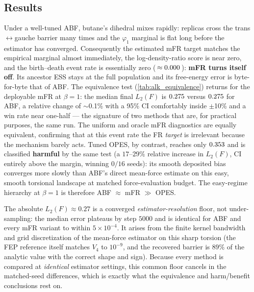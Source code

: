 \subsection{Results}

Under a well-tuned ABF, butane's dihedral mixes rapidly: replicas cross the
trans$\leftrightarrow$gauche barrier many times and the $\varphi_1$ marginal is flat
long before the estimator has converged. Consequently the estimated mFR target
matches the empirical marginal almost immediately, the log-density-ratio score is
near zero, and the birth--death event rate is essentially zero
(\,$\approx0.000$\,): \textbf{mFR turns itself off}. Its ancestor ESS
stays at the full population and its free-energy error is byte-for-byte that of ABF.
The equivalence test (\cref{tab:alk_equivalence}) returns
\textbf{\AlkButaneVerdict} for the deployable mFR at $\beta=1$: the median final
$L_2(F)$ is $\AlkButaneFrL2$ versus $\AlkButaneAbfL2$ for ABF, a relative change of
$\sim$0.1\% with a 95\% CI comfortably inside $\pm$10\% and a win rate near
one-half --- the signature of two methods that are, for practical purposes, the same
run. The uniform and oracle mFR diagnostics are equally equivalent, confirming that
at this event rate the FR \emph{target} is irrelevant because the mechanism barely
acts. Tuned OPES, by contrast, reaches only $\AlkButaneOpesL2$ and is classified
\textbf{harmful} by the same test (a $17$--$29\%$ relative increase in $L_2(F)$,
CI entirely above the margin, winning $0/16$ seeds): its smooth deposited bias
converges more slowly than ABF's direct mean-force estimate on this easy, smooth
torsional landscape at matched force-evaluation budget. The easy-regime hierarchy
at $\beta=1$ is therefore ABF $\approx$ mFR $\gg$ OPES.

\begin{remark}
\label{rem:alk_floor}
The absolute $L_2(F)\approx0.27$ is a converged \emph{estimator-resolution} floor, not
under-sampling: the median error plateaus by step $5000$ and is identical for ABF and
every mFR variant to within $5\times10^{-4}$. It arises from the finite kernel
bandwidth and grid discretization of the mean-force estimator on this sharp torsion
(the FEP reference itself matches $V_4$ to $10^{-9}$, and the recovered barrier is
$89\%$ of the analytic value with the correct shape and sign). Because every method
is compared at \emph{identical} estimator settings, this common floor cancels in the
matched-seed differences, which is exactly what the equivalence and harm/benefit
conclusions rest on.
\end{remark}

